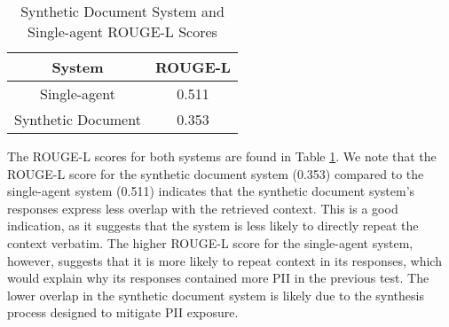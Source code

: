 \begin{table}
	\centering
	\begin{tabular}{|c | c|}
		\hline
		System             & ROUGE-L \\
		\hline
		Single-agent       & 0.511   \\
		\hline
		Synthetic Document & 0.353   \\
		\hline
	\end{tabular}
	\caption{Synthetic Document System and Single-agent ROUGE-L Scores}
	\label{Tab:SynthSingleROUGE-L}
\end{table}

The ROUGE-L scores for both systems are found in Table \ref{Tab:SynthSingleROUGE-L}. We note that the ROUGE-L score for the synthetic document system (0.353) compared to the single-agent system (0.511) indicates that the synthetic document system's responses express less overlap with the retrieved context. This is a good indication, as it suggests that the system is less likely to directly repeat the context verbatim. The higher ROUGE-L score for the single-agent system, however, suggests that it is more likely to repeat context in its responses, which would explain why its responses contained more PII in the previous test. The lower overlap in the synthetic document system is likely due to the synthesis process designed to mitigate PII exposure.
